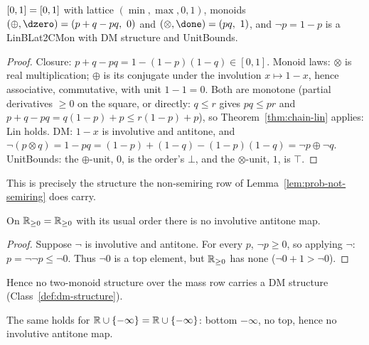 \begin{lemma}
\label{lem:unit-interval-truth-structure}
\leanok
$[0,1] = [0,1]$ with lattice $(\min,\max,0,1)$, monoids
$(\oplus,\dzero) = (p+q-pq,\ 0)$ and $(\otimes,\done) = (pq,\ 1)$, and
$\neg p = 1-p$ is a LinBLat2CMon with DM structure and UnitBounds.
\end{lemma}

\begin{proof}
\leanok
Closure: $p+q-pq = 1-(1-p)(1-q) \in [0,1]$. Monoid laws: $\otimes$ is
real multiplication; $\oplus$ is its conjugate under the involution
$x \mapsto 1-x$, hence associative, commutative, with unit
$1-1=0$. Both are monotone (partial derivatives $\ge 0$ on the square,
or directly: $q \le r$ gives $pq \le pr$ and
$p+q-pq = q(1-p)+p \le r(1-p)+p$), so Theorem~\ref{thm:chain-lin}
applies: Lin holds. DM: $1-x$ is involutive and antitone, and
$\neg(p \otimes q) = 1-pq = (1-p)+(1-q)-(1-p)(1-q) = \neg p \oplus \neg q$.
UnitBounds: the $\oplus$-unit, $0$, is the order's $\bot$, and the
$\otimes$-unit, $1$, is $\top$.
\end{proof}

This is precisely the structure the non-semiring row of
Lemma~\ref{lem:prob-not-semiring} does carry.

\begin{theorem}
\label{thm:no-dm-mass}
\leanok
On $\mathbb R_{\ge 0} = \mathbb{R}_{\ge 0}$ with its usual order there is no
involutive antitone map.
\end{theorem}

\begin{proof}
\leanok
Suppose $\neg$ is involutive and antitone. For every $p$,
$\neg p \ge 0$, so applying $\neg$: $p = \neg\neg p \le \neg 0$. Thus
$\neg 0$ is a top element, but $\mathbb R_{\ge 0}$ has none
($\neg 0 + 1 > \neg 0$).
\end{proof}

Hence no two-monoid structure over the mass row carries a DM structure
(Class~\ref{def:dm-structure}).

\begin{theorem}
\label{thm:no-dm-log}
\leanok
The same holds for $\mathbb R \cup \{-\infty\} = \mathbb{R} \cup \{-\infty\}$: bottom
$-\infty$, no top, hence no involutive antitone map.
\end{theorem}

